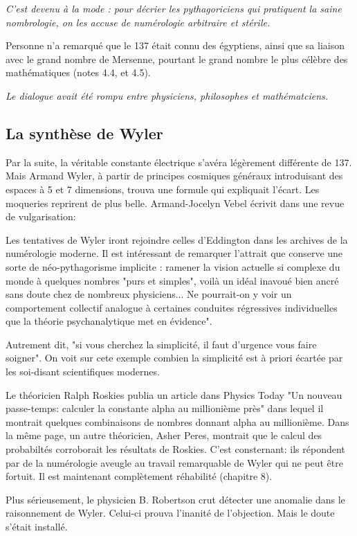 \documentclass[a4paper,12pt]{article}
\begin{document}
\textit{C'est devenu à la mode : pour décrier les pythagoriciens qui pratiquent la saine nombrologie, on les accuse de numérologie arbitraire et stérile.}

Personne n'a remarqué que le 137 était connu des égyptiens, ainsi que sa liaison avec le grand nombre de Mersenne, pourtant le grand nombre le plus célèbre des mathématiques (notes 4.4, et 4.5). 


\textit{Le dialogue avait été rompu entre physiciens, philosophes et mathématciens.}


\subsection{La synthèse de Wyler}

Par la suite, la véritable constante électrique s'avéra légèrement différente de 137. Mais Armand Wyler, à partir de principes cosmiques généraux introduisant des espaces à 5 et 7 dimensions, trouva une formule qui expliquait l'écart. Les moqueries reprirent de plus belle. Armand-Jocelyn Vebel écrivit dans une revue de vulgarisation: 

Les tentatives de Wyler iront rejoindre  celles d'Eddington dans les archives de la numérologie moderne. Il est intéressant de remarquer l'attrait que conserve une sorte de néo-pythagorisme implicite : ramener la vision actuelle si complexe du monde à quelques nombres "purs et simples", voilà un idéal inavoué bien ancré sans doute chez de nombreux physiciens... Ne pourrait-on y voir un comportement collectif analogue à certaines conduites régressives individuelles que la théorie psychanalytique met en évidence".

Autrement dit, "si vous cherchez la simplicité, il faut d'urgence vous faire soigner". On voit sur cete exemple combien la simplicité est à priori écartée par les soi-disant scientifiques modernes.

Le théoricien Ralph Roskies publia un article dans Physics Today "Un nouveau passe-temps: calculer la constante alpha au millionième près" dans lequel il montrait quelques combinaisons de nombres donnant alpha au millionième. Dans la même page, un autre théoricien, Asher Peres, montrait que le calcul des probabiltés corroborait les résultats de Roskies. C'est consternant: ils répondent par de la numérologie aveugle au travail remarquable de Wyler qui ne peut être fortuit. Il est maintenant complètement réhabilité (chapitre 8).

Plus sérieusement, le physicien B. Robertson crut détecter une anomalie dans le raisonnement de Wyler. Celui-ci prouva l'inanité de l'objection. Mais le doute s'était installé. 
\end{document}

